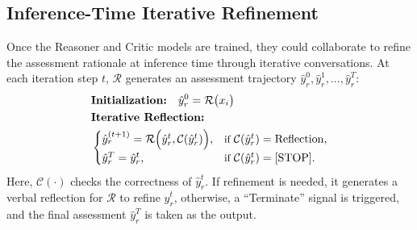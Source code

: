 \subsection*{Inference-Time Iterative Refinement}
Once the Reasoner and Critic models are trained, they could collaborate to refine the assessment rationale at inference time through iterative conversations. At each iteration step \( t \), \(\mathcal{R}\) generates an assessment trajectory \(\hat{y}_r^{0}, \hat{y}_r^{1}, ...,\hat{y}_r^{T}\): 
\vspace{-2mm}
\begin{equation}
\begin{aligned}
&\textbf{Initialization:} \quad \hat{y}_r^0 = \mathcal{R}\bigl(x_i\bigr) \\
&\textbf{Iterative~Reflection:} \quad \\
&\begin{cases}
\hat{y}_r^{(t+1)} = \mathcal{R}\Bigl(\hat{y}_r^{t},\mathcal{C}(\hat{y}_r^{t})\Bigr), 
& \small\text{if } \mathcal{C}(\hat{y}_r^{t})=\mathrm{Reflection},\\
\hat{y}_r^T = \hat{y}_r^{t},
& \small\text{if } \mathcal{C}(\hat{y}_r^{t})=\mathrm{[STOP]}.
\end{cases}
\end{aligned}\notag
\label{eq:reasoner_critic_update}
\end{equation}
\noindent
Here, \(\mathcal{C}(\cdot)\) checks the correctness of \(\hat{y}_r^{t}\). If refinement is needed, it generates a verbal reflection for \(\mathcal{R}\) to refine \(\hat{y}_r^{t}\), otherwise, a ``Terminate'' signal is triggered, and the final assessment \(\hat{y}_r^T\) is taken as the output.
